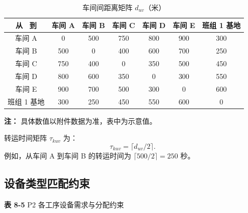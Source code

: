 \documentclass[UTF8,a4paper,12pt]{ctexart}
\begin{document}
\begin{table}[htbp]
  \centering
  \caption{车间间距离矩阵 $d_{uv}$（米）}
  \label{tab:distance}
  \begin{tabular}{ccccccc}
    \toprule
    从 \ 到 & 车间 A & 车间 B & 车间 C & 车间 D & 车间 E & 班组 1 基地 \\
    \midrule
    车间 A & 0 & 500 & 750 & 800 & 900 & 300 \\
    车间 B & 500 & 0 & 400 & 600 & 700 & 250 \\
    车间 C & 750 & 400 & 0 & 350 & 500 & 450 \\
    车间 D & 800 & 600 & 350 & 0 & 300 & 550 \\
    车间 E & 900 & 700 & 500 & 300 & 0 & 600 \\
    班组 1 基地 & 300 & 250 & 450 & 550 & 600 & 0 \\
    \bottomrule
  \end{tabular}
\end{table}
\noindent \textbf{注：} 具体数值以附件数据为准，表中为示意值。

转运时间矩阵 $\tau_{kuv}$ 为：
\begin{equation}
\tau_{kuv} = \lceil d_{uv} / 2 \rceil. \tag{8-2}
\end{equation}
例如，从车间 A 到车间 B 的转运时间为 $\lceil 500 / 2 \rceil = 250$ 秒。

\subsection{设备类型匹配约束}
\textbf{表 8-5} P2 各工序设备需求与分配约束
\end{document}
